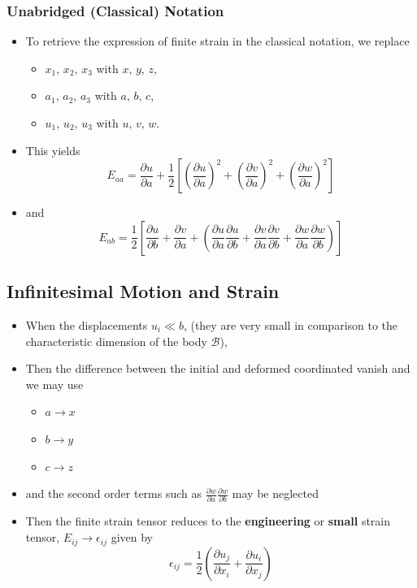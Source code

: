 \documentclass[11pt]{article}
\begin{document}
\subsubsection*{Unabridged (Classical) Notation}
\label{sec:org4fae96c}
\begin{itemize}
\item To retrieve the expression of finite strain in the classical notation, we replace
\begin{itemize}
\item \(x_1,\,x_2,\,x_3\) with \(x,\,y,\,z\),
\item \(a_1,\,a_2,\,a_3\) with \(a,\,b,\,c\),
\item \(u_1,\,u_2,\,u_3\) with \(u,\,v,\,w\).
\end{itemize}
\end{itemize}
\begin{itemize}
\item This yields  
$$  E_{aa} = \frac{\partial u}{\partial a} + \frac{1}{2} \left[ \left( \frac{\partial u}{\partial a} \right)^2 + \left( \frac{\partial v}{\partial a} \right)^2 + \left( \frac{\partial w}{\partial a} \right)^2 \right] $$
\item and
$$  E_{ab} = \frac{1}{2} \left[ \frac{\partial u}{\partial b} + \frac{\partial v}{\partial a} + \left( \frac{\partial u}{\partial a}\frac{\partial u}{\partial b} + \frac{\partial v}{\partial a}\frac{\partial v}{\partial b} + \frac{\partial w}{\partial a}\frac{\partial w}{\partial b}  \right)  \right] $$
\end{itemize}
\subsection*{Infinitesimal Motion and Strain}
\label{sec:org19635eb}
\begin{itemize}
\item When the displacements \(u_i \ll b\), (they are very small in comparison to the characteristic dimension of the body \(\mathcal{B}\)),
\item Then the difference between the initial and deformed coordinated vanish and we may use
\begin{itemize}
\item \(a \to x\)
\item \(b \to y\)
\item \(c \to z\)
\end{itemize}
\end{itemize}
\begin{itemize}
\item and the second order terms such as \(\frac{\partial w}{\partial a}\frac{\partial w}{\partial b}\) may be neglected
\item Then the finite strain tensor reduces to the \textbf{engineering} or \textbf{small} strain tensor, \(E_{ij} \to \epsilon_{ij}\)  given by
$$ \epsilon_{ij} = \frac{1}{2} \left( \frac{\partial u_j}{\partial x_i} + \frac{\partial u_i}{\partial x_j} \right) $$
\end{itemize}
\end{document}
